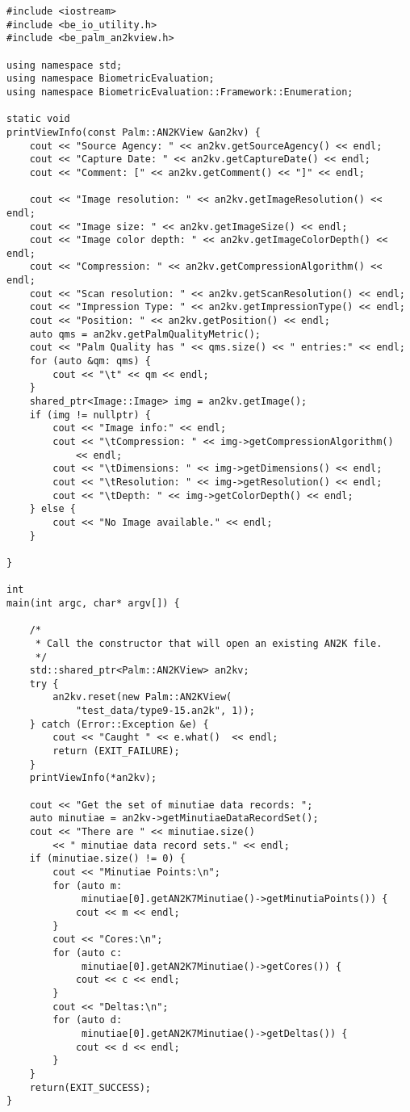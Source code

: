 \begin{lstlisting}[caption={Using the Palm::AN2KView Class}, label=lst:isopalmuse]
#include <iostream>
#include <be_io_utility.h>
#include <be_palm_an2kview.h>

using namespace std;
using namespace BiometricEvaluation;
using namespace BiometricEvaluation::Framework::Enumeration;

static void
printViewInfo(const Palm::AN2KView &an2kv) {
	cout << "Source Agency: " << an2kv.getSourceAgency() << endl;
	cout << "Capture Date: " << an2kv.getCaptureDate() << endl;
	cout << "Comment: [" << an2kv.getComment() << "]" << endl;

	cout << "Image resolution: " << an2kv.getImageResolution() << endl;
	cout << "Image size: " << an2kv.getImageSize() << endl;
	cout << "Image color depth: " << an2kv.getImageColorDepth() << endl;
	cout << "Compression: " << an2kv.getCompressionAlgorithm() << endl;
	cout << "Scan resolution: " << an2kv.getScanResolution() << endl;
	cout << "Impression Type: " << an2kv.getImpressionType() << endl;
	cout << "Position: " << an2kv.getPosition() << endl;
	auto qms = an2kv.getPalmQualityMetric();
	cout << "Palm Quality has " << qms.size() << " entries:" << endl;
	for (auto &qm: qms) {
		cout << "\t" << qm << endl;
	}
	shared_ptr<Image::Image> img = an2kv.getImage();
	if (img != nullptr) {
		cout << "Image info:" << endl;
		cout << "\tCompression: " << img->getCompressionAlgorithm()
		    << endl;
		cout << "\tDimensions: " << img->getDimensions() << endl;
		cout << "\tResolution: " << img->getResolution() << endl;
		cout << "\tDepth: " << img->getColorDepth() << endl;
	} else {
		cout << "No Image available." << endl;
	}

}

int
main(int argc, char* argv[]) {

	/*
	 * Call the constructor that will open an existing AN2K file.
	 */
	std::shared_ptr<Palm::AN2KView> an2kv;
	try {
		an2kv.reset(new Palm::AN2KView(
		    "test_data/type9-15.an2k", 1));
	} catch (Error::Exception &e) {
		cout << "Caught " << e.what()  << endl;
		return (EXIT_FAILURE);
	} 
	printViewInfo(*an2kv);

	cout << "Get the set of minutiae data records: ";
	auto minutiae = an2kv->getMinutiaeDataRecordSet();
	cout << "There are " << minutiae.size()
	    << " minutiae data record sets." << endl;
	if (minutiae.size() != 0) {
		cout << "Minutiae Points:\n";
		for (auto m:
		     minutiae[0].getAN2K7Minutiae()->getMinutiaPoints()) {
			cout << m << endl;
		}
		cout << "Cores:\n";
		for (auto c:
		     minutiae[0].getAN2K7Minutiae()->getCores()) {
			cout << c << endl;
		}
		cout << "Deltas:\n";
		for (auto d:
		     minutiae[0].getAN2K7Minutiae()->getDeltas()) {
			cout << d << endl;
		}
	}
	return(EXIT_SUCCESS);
}
\end{lstlisting}
